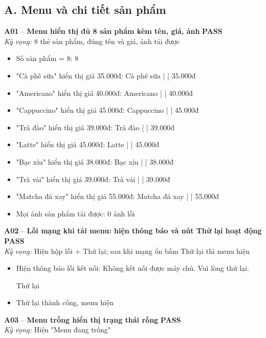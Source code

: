 \documentclass[a4paper,11pt]{article}
\newcommand{\ok}{\textcolor{okgreen}{\textbf{PASS}}}
\begin{document}
\subsection{A. Menu và chi tiết sản phẩm}
\begin{minipage}{\textwidth}\vspace{4pt}\textbf{\textcolor{brew}{A01}} -- \textbf{Menu hiển thị đủ 8 sản phẩm kèm tên, giá, ảnh} \hfill \ok\\
{\small\emph{Kỳ vọng:} 8 thẻ sản phẩm, đúng tên và giá, ảnh tải được}
\end{minipage}
\begin{itemize}\footnotesize
\item \tick Số sản phẩm = 8: 8
\item \tick "Cà phê sữa" hiển thị giá 35.000đ: Cà phê sữa |  | 35.000đ
\item \tick "Americano" hiển thị giá 40.000đ: Americano |  | 40.000đ
\item \tick "Cappuccino" hiển thị giá 45.000đ: Cappuccino |  | 45.000đ
\item \tick "Trà đào" hiển thị giá 39.000đ: Trà đào |  | 39.000đ
\item \tick "Latte" hiển thị giá 45.000đ: Latte |  | 45.000đ
\item \tick "Bạc xỉu" hiển thị giá 38.000đ: Bạc xỉu |  | 38.000đ
\item \tick "Trà vải" hiển thị giá 39.000đ: Trà vải |  | 39.000đ
\item \tick "Matcha đá xay" hiển thị giá 55.000đ: Matcha đá xay |  | 55.000đ
\item \tick Mọi ảnh sản phẩm tải được: 0 ảnh lỗi
\end{itemize}
\begin{minipage}{\textwidth}\vspace{4pt}\textbf{\textcolor{brew}{A02}} -- \textbf{Lỗi mạng khi tải menu: hiện thông báo và nút Thử lại hoạt động} \hfill \ok\\
{\small\emph{Kỳ vọng:} Hiện hộp lỗi + Thử lại; sau khi mạng ổn bấm Thử lại thì menu hiện}
\end{minipage}
\begin{itemize}\footnotesize
\item \tick Hiện thông báo lỗi kết nối: Không kết nối được máy chủ. Vui lòng thử lại.

Thử lại
\item \tick Thử lại thành công, menu hiện
\end{itemize}
\begin{minipage}{\textwidth}\vspace{4pt}\textbf{\textcolor{brew}{A03}} -- \textbf{Menu trống hiển thị trạng thái rỗng} \hfill \ok\\
{\small\emph{Kỳ vọng:} Hiện "Menu đang trống"}
\end{minipage}
\end{document}
